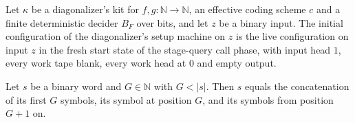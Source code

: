 \begin{theorem}
\label{Turing.NTimeDiag.dz_initCfg}
\leanok
{}
Let $\kappa$ be a diagonalizer's kit for $f, g : \mathbb{N} \to \mathbb{N}$, an effective coding scheme $c$ and a finite deterministic decider $B_F$ over bits, and let $z$ be a binary input. The initial configuration of the diagonalizer's setup machine on $z$ is the live configuration on input $z$ in the fresh start state of the stage-query call phase, with input head $1$, every work tape blank, every work head at $0$ and empty output.
\end{theorem}

\begin{theorem}
\label{Turing.NTimeDiag.dz_split_stream}
\leanok
{}
Let $s$ be a binary word and $G \in \mathbb{N}$ with $G < |s|$. Then $s$ equals the concatenation of its first $G$ symbols, its symbol at position $G$, and its symbols from position $G + 1$ on.
\end{theorem}

